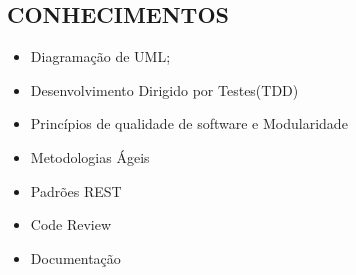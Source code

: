 \begin{framed}
    \section{CONHECIMENTOS}
    \begin{itemize}
      \item Diagramação de UML;
      \item Desenvolvimento Dirigido por Testes(TDD)
      \item Princípios de qualidade de software e Modularidade
      \item Metodologias Ágeis
      \item Padrões REST
      \item Code Review
      \item Documentação
    \end{itemize}
  \end{framed}